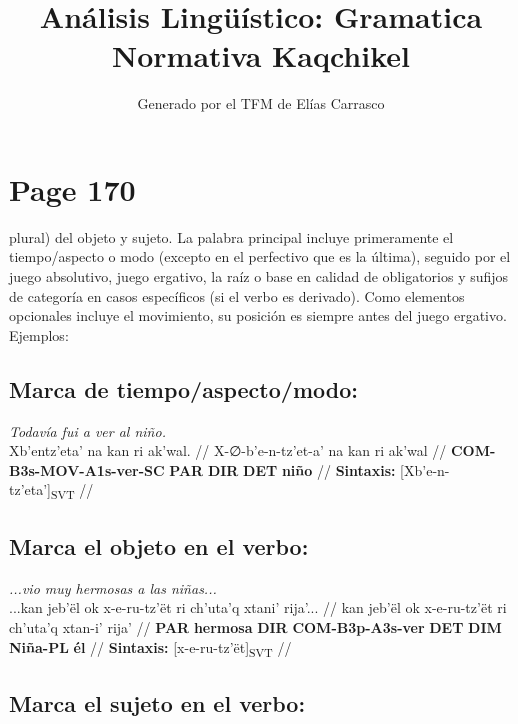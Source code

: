 \documentclass{article}%
\title{Análisis Lingüístico: Gramatica Normativa Kaqchikel}%
\author{Generado por el TFM de Elías Carrasco}%
\begin{document}
%
\normalsize%
\maketitle%
\section{Page 170}%
\label{sec:Page170}%
plural) del objeto y sujeto. La palabra principal incluye primeramente el tiempo/aspecto %
o modo (excepto en el perfectivo que es la última), seguido por el juego absolutivo, %
juego ergativo, la raíz o base en calidad de obligatorios y sufijos de categoría en casos %
específicos (si el verbo es derivado). Como elementos opcionales incluye el movimiento, %
su posición es siempre antes del juego ergativo. Ejemplos: %
\subsection{Marca de tiempo/aspecto/modo:}%
\label{subsec:Marcadetiempo/aspecto/modo}%

%
\par\medskip%
\ex
\textit{Todavía fui a ver al niño.} \\
\begingl
\gla Xb'entz'eta' na kan ri ak'wal. //
\glb X-∅-b'e-n-tz'et-a' na kan ri ak'wal //
\glc \textbf{COM-}\textbf{B3s-}\textbf{MOV-}\textbf{A1s-}\textbf{ver-}\textbf{SC} \textbf{PAR} \textbf{DIR} \textbf{DET} \textbf{niño} //
\glft \textbf{Sintaxis:} [Xb'e-n-tz'eta']\textsubscript{SVT} //
\endgl
\xe
%
\medskip%
\subsection{Marca el objeto en el verbo:}%
\label{subsec:Marcaelobjetoenelverbo}%

%
\par\medskip%
\ex
\textit{...vio muy hermosas a las niñas...} \\
\begingl
\gla ...kan jeb'ël ok x-e-ru-tz'ët ri ch'uta'q xtani' rija'... //
\glb kan jeb'ël ok x-e-ru-tz'ët ri ch'uta'q xtan-i' rija' //
\glc \textbf{PAR} \textbf{hermosa} \textbf{DIR} \textbf{COM-}\textbf{B3p-}\textbf{A3s-}\textbf{ver} \textbf{DET} \textbf{DIM} \textbf{Niña-PL} \textbf{él} //
\glft \textbf{Sintaxis:} [x-e-ru-tz'ët]\textsubscript{SVT} //
\endgl
\xe
%
\medskip%
\subsection{Marca el sujeto en el verbo:}%
\label{subsec:Marcaelsujetoenelverbo}%
\end{document}
